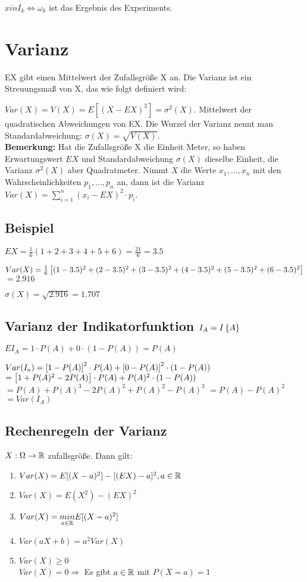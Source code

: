 $x in I_k \Leftrightarrow \omega_k$ ist das Ergebnis des Experiments. 

\section{Varianz}
EX gibt einen Mittelwert der Zufallsgröße X an. Die Varianz ist ein Streuungsmaß von X, das wie folgt definiert wird: 

$Var(X) = V(X) = E[(X-EX)^2] = \sigma^2(X)$. Mittelwert der quadratischen Abweichungen von EX. Die Wurzel der Varianz nennt man Standardabweichung: $\sigma(X) = \sqrt{V(X)} $. \\

\textbf{Bemerkung:} Hat die Zufallsgröße X die Einheit Meter, so haben Erwartungswert $EX$ und Standardabweichung $\sigma (X)$ dieselbe Einheit, die Varianz $\sigma^2(X)$ aber Quadratmeter. 
Nimmt $X$ die Werte $x_1, ..., x_n$ mit den Wahrscheinlichkeiten $p_1, ..., p_n$ an, dann ist die Varianz 
$Var(X) = \sum_{i=1}^{n} (x_i - EX)^2 \cdot p_i$. 

\subsection{Beispiel}
$EX = \frac{1}{6} (1+2+3+4+5+6) = \frac{21}{6} = 3.5$

$Var(X) = \frac{1}{6}  \left[ (1-3.5)^2 + (2-3.5)^2 + (3-3.5)^2 + (4-3.5)^2 + (5-3.5)^2 + (6-3.5)^2 \right] $
$= 2.916$

$\sigma (X) = \sqrt{2.916} = 1.707$	

\subsection{Varianz der Indikatorfunktion $I_A = I \left\lbrace A \right\rbrace $}

$E I_A = 1 \cdot P(A) + 0\cdot (1-P(A)) = P(A)$

$Var(I_a) =  \left[ 1-P(A) \right] ^2 \cdot P(A) +  \left[ 0-P(A) \right] ^2 \cdot  \left( 1-P(A) \right) $
$=  \left[ 1 + P(A)^2 - 2 P(A) \right]  \cdot P(A) + P(A)^2 \cdot  \left( 1-P(A) \right) $
$=P(A) + P(A)^3 - 2 P(A)^2 + P(A)^2 - P(A)^3$
\underline{$=P(A) - P(A)^2$}
$=Var(I_A)$	

\subsection{Rechenregeln der Varianz}
\begin{satz}
$X: \Omega \rightarrow \mathbb{R}$ zufallsgröße. Dann gilt: 
\begin{enumerate}
\item $Var(X) = E[(X-a)^2] - [(EX) - a]^2, a\in \mathbb{R}$
\item $Var(X) = E(X^2) - (EX)^2$
\item $Var(X) = \underset{a\in\mathbb{R}}{min} E[(X-a)^2]$
\item $Var(aX+b) = a^2 Var(X)$
\item $Var(X) \geq 0$\\
$Var(X) = 0 \Rightarrow $ Es gibt $a\in\mathbb{R}$ mit $P(X=a)=1$
\end{enumerate}
\end{satz}

